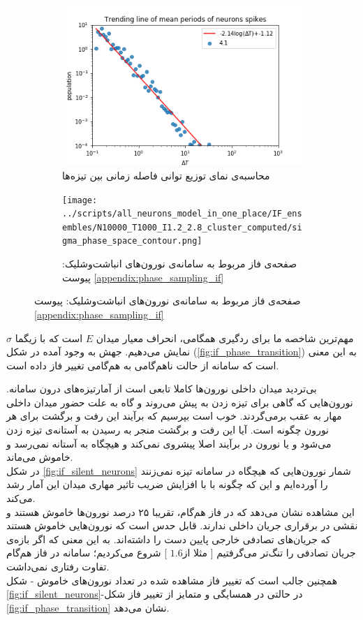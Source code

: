 \begin{figure}
\begin{subfigure}[b]{0.5\textwidth}
		\includegraphics[width = \textwidth]{../papers_studies/figs/IF/mean_spiking_persiods_with_trending_line.png}
		\caption{محاسبه‌ی نمای توزیع توانی فاصله زمانی بین تیزه‌ها}
		\label{fig:if_isi_trending_line}
	\end{subfigure}
	\hfill
	\begin{subfigure}[b]{0.5\textwidth}
		\centering
		\texttt{[image: ../scripts/all\_neurons\_model\_in\_one\_place/IF\_ensembles/N10000\_T1000\_I1.2\_2.8\_cluster\_computed/sigma\_phase\_space\_contour.png]}
		\caption{صفحه‌ی فاز مربوط به سامانه‌ی نورون‌های انباشت‌وشلیک: پیوست \ref{appendix:phase_sampling_if}}
		\label{fig:if_g_d_phase_space}
	\end{subfigure}
\end{figure}

مهم‌ترین شاخصه ما برای ردگیری همگامی، انحراف معیار میدان $E$ است که با زیگما $\sigma$ نمایش می‌دهیم. جهش به وجود آمده در شکل‌ (\ref{fig:if_phase_transition}) به این معنی است که سامانه از حالت ناهم‌گامی به هم‌گامی تغییر فاز داده است. 



بی‌تردید میدان داخلی نورون‌ها کاملا تابعی است از آمارتیزه‌های درون سامانه. نورون‌هایی که گاهی برای تیزه زدن به پیش می‌روند و گاه به علت حضور میدان داخلی مهار به عقب برمی‌گردند. خوب است بپرسیم که برآیند این رفت و برگشت‌ برای هر نورون چگونه است. آیا این رفت و برگشت منجر به رسیدن به آستانه‌ی تیزه زدن می‌شود و یا نورون در برآیند اصلا پیشروی نمی‌کند و هیچگاه به آستانه نمی‌رسد و خاموش می‌ماند.\\
در شکل \ref{fig:if_silent_neurons} شمار نورون‌هایی که هیچگاه در سامانه تیزه نمی‌زنند را آورده‌ایم و این که چگونه با با افزایش ضریب تاثیر مهاری میدان این آمار رشد می‌کند.\\
این مشاهده نشان می‌دهد که در فاز هم‌گام، تقریبا ۲۵ درصد نورون‌ها خاموش هستند و نقشی در برقراری جریان داخلی ندارند. قابل حدس است که نورون‌هایی خاموش هستند که جریان‌های تصادفی خارجی پایین دست را داشته‌اند. به این معنی که اگر بازه‌ی جریان تصادفی را تنگ‌تر می‌گرفتیم [ مثلا از$1.6$ ] شروع می‌کردیم؛ سامانه در فاز هم‌گام تفاوت رفتاری نمی‌داشت.\\
همچنین جالب است که تغییر فاز مشاهده شده در تعداد نورون‌های خاموش - شکل \ref{fig:if_silent_neurons}-در حالتی در همسایگی و متمایز از تغییر فاز شکل \ref{fig:if_phase_transition} نشان می‌دهد.


